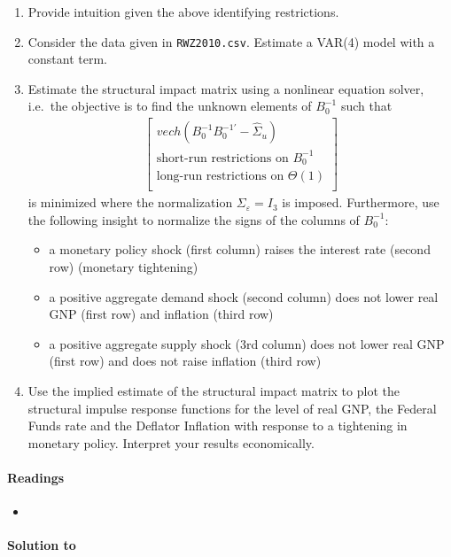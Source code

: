 \begin{enumerate}
\item Provide intuition given the above identifying restrictions.

\item Consider the data given in \texttt{RWZ2010.csv}.
Estimate a VAR{(4)} model with a constant term.

\item Estimate the structural impact matrix using a nonlinear equation solver,
  i.e.\ the objective is to find the unknown elements of \(B_{0}^{-1}\) such that
\begin{align*}
\begin{bmatrix}
vech(B_{0}^{-1}B_{0}^{-1'}-\hat{\Sigma}_u)\\
\text{short-run restrictions on }B_{0}^{-1}\\
\text{long-run restrictions on }\Theta(1)\\
\end{bmatrix}
\end{align*}
is minimized where the normalization \(\Sigma_{\varepsilon}=I_3\) is imposed.
Furthermore, use the following insight to normalize the signs of the columns of \(B_{0}^{-1}\):
\begin{itemize}
\item a monetary policy shock (first column) raises the interest rate (second row) (monetary tightening)
\item a positive aggregate demand shock (second column) does not lower real GNP (first row) and inflation (third row)
\item a positive aggregate supply shock (3rd column) does not lower real GNP (first row) and does not raise inflation (third row)
\end{itemize}

\item Use the implied estimate of the structural impact matrix to plot the structural impulse response functions
  for the level of real GNP, the Federal Funds rate and the Deflator Inflation with response to a tightening in monetary policy.
Interpret your results economically.
\end{enumerate}

\paragraph{Readings}
\begin{itemize}
\item \textcite[Ch.~10.4, 10.5, 11.3]{Kilian.Lutkepohl_2017_StructuralVectorAutoregressive}
\end{itemize}

\begin{solution}\textbf{Solution to }
\ifDisplaySolutions%

\fi
\newpage
\end{solution}